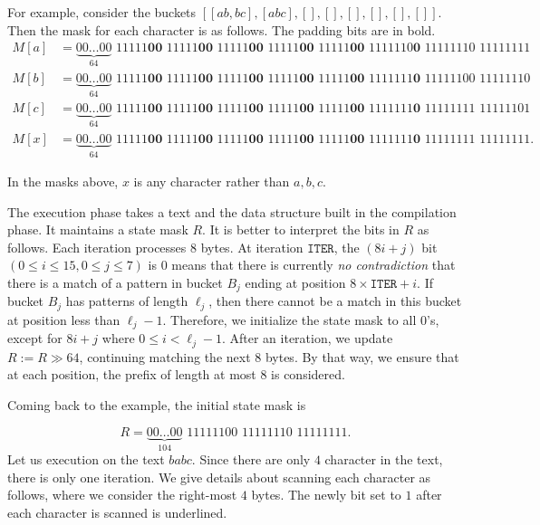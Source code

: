 For example, consider the buckets $[[ab,bc],[abc],[],[],[],[],[],[]]$. Then the mask for each character is as follows. The padding bits are in bold.
\begin{align*}
  M[a] & = \underbrace{00\ldots00}_{64}\,\, 11111\textbf{00}\,\,11111\textbf{00}\,\,11111\textbf{00}\,\,11111\textbf{00}\,\,11111\textbf{00}\,\,1111110\textbf{0} \,\, 11111110\,\,11111111  \\
  M[b] & = \underbrace{00\ldots00}_{64}\,\, 11111\textbf{00}\,\,11111\textbf{00}\,\,11111\textbf{00}\,\,11111\textbf{00}\,\,11111\textbf{00}\,\,1111111\textbf{0} \,\, 11111100\,\,11111110  \\
  M[c] & = \underbrace{00\ldots00}_{64}\,\, 11111\textbf{00}\,\,11111\textbf{00}\,\,11111\textbf{00}\,\,11111\textbf{00}\,\,11111\textbf{00}\,\,1111111\textbf{0} \,\, 11111111\,\,11111101  \\
  M[x] & = \underbrace{00\ldots00}_{64}\,\, 11111\textbf{00}\,\,11111\textbf{00}\,\,11111\textbf{00}\,\,11111\textbf{00}\,\,11111\textbf{00}\,\,1111111\textbf{0} \,\, 11111111\,\,11111111.
\end{align*}

In the masks above, $x$ is any character rather than $a,b,c$.

The execution phase takes a text and the data structure built in the compilation phase. It maintains a state mask $R$. It is better to interpret the bits in $R$ as follows. Each iteration processes $8$ bytes. At iteration $\texttt{ITER}$, the $(8i+j)$ bit $(0\le i\le 15, 0 \le j \le 7)$ is $0$ means that there is currently \textit{no contradiction} that there is a match of a pattern in bucket $B_j$ ending at position $8\times\texttt{ITER}+i$. If bucket $B_j$ has patterns of length $\ell_j$, then there cannot be a match in this bucket at position less than $\ell_j-1$. Therefore, we initialize the state mask to all $0$'s, except for $8i+j$ where $0\le i< \ell_j-1$. After an iteration, we update $R:= R \gg 64$, continuing matching the next $8$ bytes. By that way, we ensure that at each position, the prefix of length at most $8$ is considered.

Coming back to the example, the initial state mask is

$$R= \underbrace{00\ldots00}_{104} \,\, 11111100\,\,11111110\,\,11111111.$$
Let us execution on the text $babc$. Since there are only $4$ character in the text, there is only one iteration. We give details about scanning each character as follows, where we consider the right-most $4$ bytes. The newly bit set to $1$ after each character is scanned is underlined.

